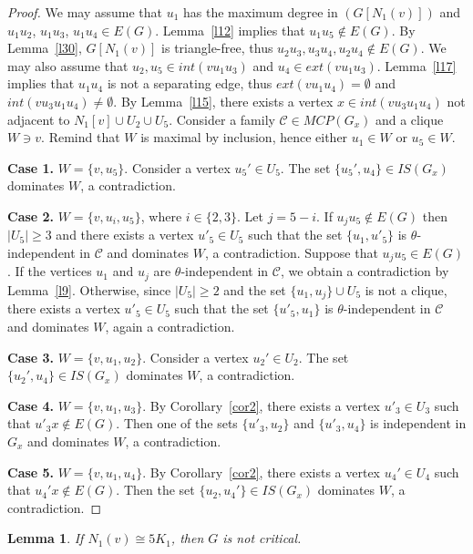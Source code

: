 \documentclass[12pt]{article}
\newtheorem{lemma}{Lemma}
\begin{document}
\begin{proof}
We may assume that $u_1$ has the maximum degree in $(G[N_1(v)])$ and $u_1u_2$, $u_1u_3$, $u_1u_4 \in E(G)$. Lemma~\ref{l12} implies that $u_1u_5 \notin E(G)$. By Lemma~\ref{l30}, $G[N_1(v)]$ is triangle-free, thus $u_2u_3,u_3u_4,u_2u_4 \notin E(G)$. We may also assume that $u_2,u_5 \in int(vu_1u_3)$ and $u_4 \in ext(vu_1u_3)$. Lemma~\ref{l17} implies that $u_1u_4$ is not a separating edge, thus $ext(vu_1u_4) = \emptyset$ and $int(vu_3u_1u_4) \neq \emptyset$. By Lemma~\ref{l15}, there exists a vertex $x \in int(vu_3u_1u_4)$ not adjacent to $N_1[v] \cup U_2 \cup U_5$.  Consider a family $\mathcal{C} \in MCP(G_x)$ and a clique $W \ni v$. Remind that $W$ is maximal by inclusion, hence either $u_1 \in W$ or $u_5 \in W$.

\textbf{Case 1.} $W = \{v,u_5\}$. Consider a vertex $u_5' \in U_5$. The set $\{u_5',u_4\} \in IS(G_x)$ dominates $W$, a contradiction. 

\textbf{Case 2.}  $W = \{v,u_i,u_5\}$, where $i \in \{2,3\}$. Let $j = 5 - i$.  If $u_ju_5 \notin E(G)$ then $|U_5| \geq 3$ and there exists a vertex $u'_5 \in U_5$ such that the set $\{u_1,u'_5\}$ is $\theta$-independent in $\mathcal{C}$ and dominates $W$, a contradiction. Suppose that $u_ju_5 \in E(G)$. If the vertices $u_1$ and $u_j$ are $\theta$-independent in $\mathcal{C}$, we obtain a contradiction by Lemma~\ref{l9}. Otherwise, since $|U_5| \geq 2$ and the set $\{u_1,u_j\} \cup U_5$ is not a clique, there exists a vertex $u'_5 \in U_5$ such that the set $\{u'_5,u_1\}$ is $\theta$-independent in $\mathcal{C}$ and dominates $W$, again a contradiction. 

\textbf{Case 3.} $W = \{v,u_1,u_2\}$. Consider a vertex $u_2' \in U_2$. The set $\{u_2',u_4\} \in IS(G_x)$ dominates $W$, a contradiction. 

\textbf{Case 4.} $W = \{v,u_1,u_3\}$. By Corollary~\ref{cor2}, there exists a vertex $u'_3 \in U_3$ such that $u'_3x \notin E(G)$. Then one of the sets $\{u'_3,u_2\}$ and $\{u'_3,u_4\}$ is independent in $G_x$ and dominates $W$, a contradiction.

\textbf{Case 5.} $W = \{v,u_1,u_4\}$. By Corollary~\ref{cor2}, there exists a vertex $u_4' \in U_4$ such that $u_4'x \notin E(G)$. Then the set $\{u_2,u_4'\} \in IS(G_x)$ dominates $W$, a contradiction.  
\end{proof}

\begin{lemma}\label{l34}
If $N_1(v) \cong 5K_1$, then $G$ is not critical.
\end{lemma}
\end{document}
